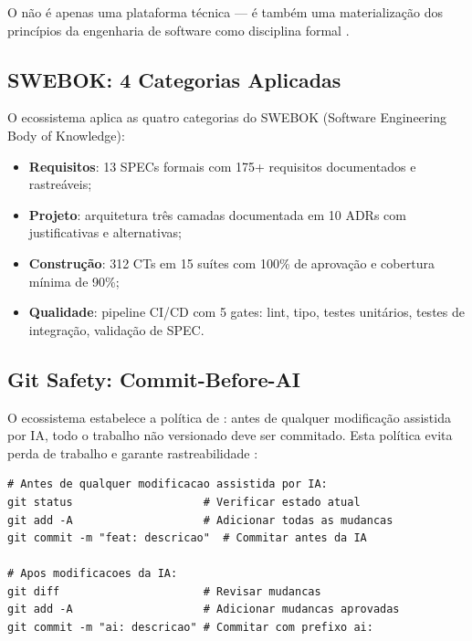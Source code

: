 O \opencodeeco{} não é apenas uma plataforma técnica --- é também uma
materialização dos princípios da engenharia de software como disciplina
formal \cite{sommerville2011engenharia, pressman2016engenharia,
fowler2019refactoring}.

\subsection{SWEBOK: 4 Categorias Aplicadas}
\label{subsec:swebok}

O ecossistema aplica as quatro categorias do SWEBOK (Software
Engineering Body of Knowledge):

\begin{itemize}
\item \textbf{Requisitos}: 13 SPECs formais com 175+ requisitos
documentados e rastreáveis;
\item \textbf{Projeto}: arquitetura três camadas documentada em 10
ADRs com justificativas e alternativas;
\item \textbf{Construção}: 312 CTs em 15 suítes com 100\% de aprovação
e cobertura mínima de 90\%;
\item \textbf{Qualidade}: pipeline CI/CD com 5 gates: lint, tipo,
testes unitários, testes de integração, validação de SPEC.
\end{itemize}

\subsection{Git Safety: Commit-Before-AI}
\label{subsec:git-safety}

O ecossistema estabelece a política de : antes de
qualquer modificação assistida por IA, todo o trabalho não versionado
deve ser commitado. Esta política evita perda de trabalho e garante
rastreabilidade \cite{opencode2026ecosystem}:

\begin{lstlisting}[style=bashstyle, caption={Git Safety workflow},
                   label={lst:git-safety}]
# Antes de qualquer modificacao assistida por IA:
git status                    # Verificar estado atual
git add -A                    # Adicionar todas as mudancas
git commit -m "feat: descricao"  # Commitar antes da IA

# Apos modificacoes da IA:
git diff                      # Revisar mudancas
git add -A                    # Adicionar mudancas aprovadas
git commit -m "ai: descricao" # Commitar com prefixo ai:
\end{lstlisting}

